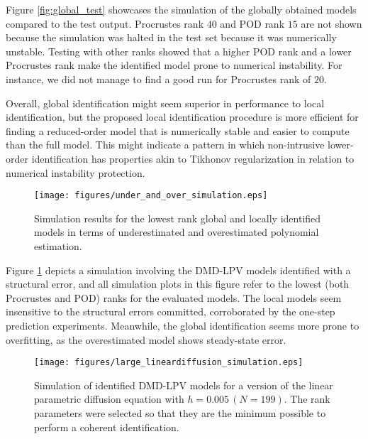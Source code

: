 Figure \ref{fig:global_test} showcases the simulation of the globally obtained models compared to the test output.
%
Procrustes rank $40$ and POD rank $15$ are not shown because the simulation was halted in the test set because it was numerically unstable.
%
Testing with other ranks showed that a higher POD rank and a lower Procrustes rank make the identified model prone to numerical instability.
%
For instance, we did not manage to find a good run for Procrustes rank of $20$.


Overall, global identification might seem superior in performance to local identification, but the proposed local identification procedure is more efficient for finding a reduced-order model that is numerically stable and easier to compute than the full model. 
%
This might indicate a pattern in which non-intrusive lower-order identification has properties akin to Tikhonov regularization in relation to numerical instability protection.


\begin{figure}
    \centering
    \texttt{[image: figures/under\_and\_over\_simulation.eps]}
    \caption{Simulation results for the lowest rank global and locally identified models in terms of underestimated and overestimated polynomial estimation.}
    \label{fig:underover_sim}
\end{figure}


Figure \ref{fig:underover_sim} depicts a simulation involving the DMD-LPV models identified with a structural error, and all simulation plots in this figure refer to the lowest (both Procrustes and POD) ranks for the evaluated models.
%
The local models seem insensitive to the structural errors committed, corroborated by the one-step prediction experiments.
%
Meanwhile, the global identification seems more prone to overfitting, as the overestimated model shows steady-state error.

\begin{figure}
    \centering
    \texttt{[image: figures/large\_lineardiffusion\_simulation.eps]}
    \caption{Simulation of identified DMD-LPV models for a version of the linear parametric diffusion equation with $h = 0.005\, (N = 199)$. The rank parameters were selected so that they are the minimum possible to perform a coherent identification.}
    \label{fig:200statediffusion}
\end{figure}


